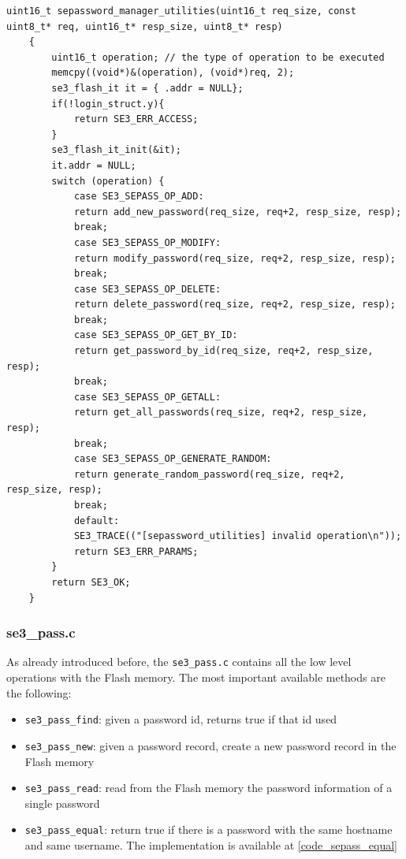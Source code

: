 \begin{lstlisting}[style=CStyle,caption="Code for searching if password record is already present", label=code_command_disp,breaklines=true]
	uint16_t sepassword_manager_utilities(uint16_t req_size, const uint8_t* req, uint16_t* resp_size, uint8_t* resp)
	{
		uint16_t operation; // the type of operation to be executed
		memcpy((void*)&(operation), (void*)req, 2);
		se3_flash_it it = { .addr = NULL};
		if(!login_struct.y){
			return SE3_ERR_ACCESS;
		}
		se3_flash_it_init(&it);
		it.addr = NULL;
		switch (operation) {
			case SE3_SEPASS_OP_ADD:
			return add_new_password(req_size, req+2, resp_size, resp);
			break;
			case SE3_SEPASS_OP_MODIFY:
			return modify_password(req_size, req+2, resp_size, resp);
			break;
			case SE3_SEPASS_OP_DELETE:
			return delete_password(req_size, req+2, resp_size, resp);
			break;
			case SE3_SEPASS_OP_GET_BY_ID:
			return get_password_by_id(req_size, req+2, resp_size, resp);
			break;
			case SE3_SEPASS_OP_GETALL:
			return get_all_passwords(req_size, req+2, resp_size, resp);
			break;
			case SE3_SEPASS_OP_GENERATE_RANDOM:
			return generate_random_password(req_size, req+2, resp_size, resp);
			break;
			default:
			SE3_TRACE(("[sepassword_utilities] invalid operation\n"));
			return SE3_ERR_PARAMS;
		}
		return SE3_OK;
	}	
\end{lstlisting}



\subsubsection{se3\_pass.c}
As already introduced before, the \texttt{se3\_pass.c} contains all the low level operations with the Flash memory. The most important available methods are the following:
\begin{itemize}
	\item \texttt{se3\_pass\_find}: given a password id, returns true if that id used
	\item \texttt{se3\_pass\_new}: given a password record, create a new password record in the Flash memory
	\item \texttt{se3\_pass\_read}: read from the Flash memory the password information of a single password
	\item \texttt{se3\_pass\_equal}: return true if there is a password with the same hostname and same username. The implementation is available at \ref{code_sepass_equal}
\end{itemize}

